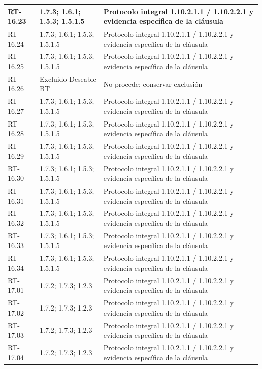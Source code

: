 \begin{longtable}{L{23mm}L{46mm}L{72mm}}
RT-16.23 & 1.7.3; 1.6.1; 1.5.3; 1.5.1.5 & Protocolo integral 1.10.2.1.1 / 1.10.2.2.1 y evidencia específica de la cláusula\\\hline
RT-16.24 & 1.7.3; 1.6.1; 1.5.3; 1.5.1.5 & Protocolo integral 1.10.2.1.1 / 1.10.2.2.1 y evidencia específica de la cláusula\\\hline
RT-16.25 & 1.7.3; 1.6.1; 1.5.3; 1.5.1.5 & Protocolo integral 1.10.2.1.1 / 1.10.2.2.1 y evidencia específica de la cláusula\\\hline
RT-16.26 & Excluido Deseable BT & No procede; conservar exclusión\\\hline
RT-16.27 & 1.7.3; 1.6.1; 1.5.3; 1.5.1.5 & Protocolo integral 1.10.2.1.1 / 1.10.2.2.1 y evidencia específica de la cláusula\\\hline
RT-16.28 & 1.7.3; 1.6.1; 1.5.3; 1.5.1.5 & Protocolo integral 1.10.2.1.1 / 1.10.2.2.1 y evidencia específica de la cláusula\\\hline
RT-16.29 & 1.7.3; 1.6.1; 1.5.3; 1.5.1.5 & Protocolo integral 1.10.2.1.1 / 1.10.2.2.1 y evidencia específica de la cláusula\\\hline
RT-16.30 & 1.7.3; 1.6.1; 1.5.3; 1.5.1.5 & Protocolo integral 1.10.2.1.1 / 1.10.2.2.1 y evidencia específica de la cláusula\\\hline
RT-16.31 & 1.7.3; 1.6.1; 1.5.3; 1.5.1.5 & Protocolo integral 1.10.2.1.1 / 1.10.2.2.1 y evidencia específica de la cláusula\\\hline
RT-16.32 & 1.7.3; 1.6.1; 1.5.3; 1.5.1.5 & Protocolo integral 1.10.2.1.1 / 1.10.2.2.1 y evidencia específica de la cláusula\\\hline
RT-16.33 & 1.7.3; 1.6.1; 1.5.3; 1.5.1.5 & Protocolo integral 1.10.2.1.1 / 1.10.2.2.1 y evidencia específica de la cláusula\\\hline
RT-16.34 & 1.7.3; 1.6.1; 1.5.3; 1.5.1.5 & Protocolo integral 1.10.2.1.1 / 1.10.2.2.1 y evidencia específica de la cláusula\\\hline
RT-17.01 & 1.7.2; 1.7.3; 1.2.3 & Protocolo integral 1.10.2.1.1 / 1.10.2.2.1 y evidencia específica de la cláusula\\\hline
RT-17.02 & 1.7.2; 1.7.3; 1.2.3 & Protocolo integral 1.10.2.1.1 / 1.10.2.2.1 y evidencia específica de la cláusula\\\hline
RT-17.03 & 1.7.2; 1.7.3; 1.2.3 & Protocolo integral 1.10.2.1.1 / 1.10.2.2.1 y evidencia específica de la cláusula\\\hline
RT-17.04 & 1.7.2; 1.7.3; 1.2.3 & Protocolo integral 1.10.2.1.1 / 1.10.2.2.1 y evidencia específica de la cláusula\\\hline

\end{longtable}
